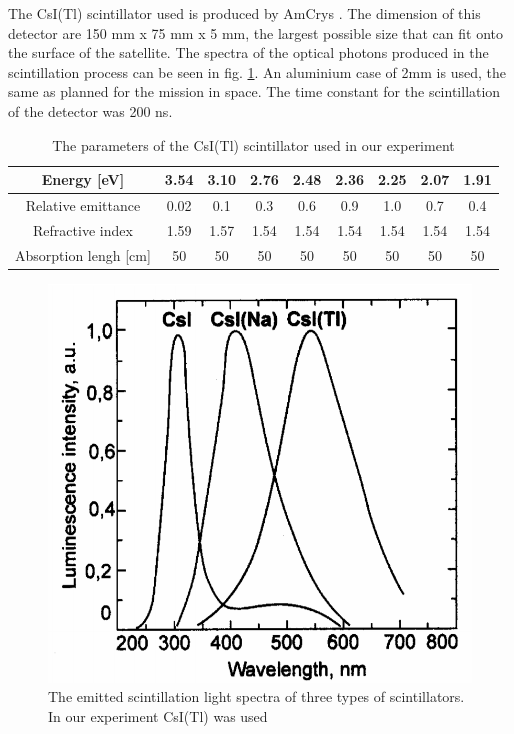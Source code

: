 \documentclass[12pt, a4paper,titlepage]{article}
\numberwithin{equation}{section}
\numberwithin{figure}{section}
\begin{document}
The CsI(Tl) scintillator used is produced by AmCrys \cite{scinti}. The dimension of this detector are 150 mm x 75 mm x 5 mm, the largest possible size that can fit onto the surface of the satellite. The spectra of the optical photons produced in the scintillation process can be seen in fig. \ref{fig:scint_yield}. An aluminium case of 2mm is used, the same as planned for the mission in space. The time constant for the scintillation of the detector was 200 ns.

\begin{table}[h!]
\begin{center}
\begin{tabular}{ |c|c|c|c|c|c|c|c|c|} 
 \hline
 Energy [eV] & 3.54 & 3.10 & 2.76 & 2.48 & 2.36 & 2.25 & 2.07 & 1.91\\\hline
 Relative emittance & 0.02 & 0.1 & 0.3 & 0.6 & 0.9 & 1.0 & 0.7 & 0.4 \\\hline
 Refractive index & 1.59 & 1.57 & 1.54 & 1.54 & 1.54 & 1.54 & 1.54 & 1.54 \\\hline
 Absorption lengh [cm] & 50 & 50 & 50 & 50 & 50 & 50 & 50 & 50  \\\hline
\end{tabular}
\end{center}
\caption{The parameters of the CsI(Tl) scintillator used in our experiment}
\end{table}


\begin{figure}[H]
\centering
\includegraphics[width=130.0mm]{images/spectracsitl.png}
\caption{The emitted scintillation light spectra of three types of scintillators. In our experiment CsI(Tl) was used}
\label{fig:scint_yield}
\end{figure}
\end{document}
